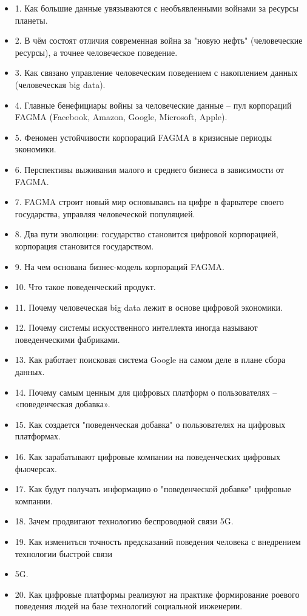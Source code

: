 \begin{itemize}
\item 1. Как большие данные увязываются с необъявленными войнами за ресурсы планеты.
\item 2. В чём состоят отличия современная война за "новую нефть" (человеческие ресурсы), а точнее человеческое поведение.
\item 3. Как связано управление человеческим поведением с накоплением данных (человеческая big data).
\item 4. Главные бенефициары войны за человеческие данные – пул корпораций FAGMA (Facebook, Amazon, Google, Microsoft, Apple).
\item 5. Феномен устойчивости корпораций FAGMA в кризисные периоды экономики.
\item 6. Перспективы выживания малого и среднего бизнеса в зависимости от FAGMA.
\item 7. FAGMA строит новый мир основываясь на цифре в фарватере своего государства, управляя человеческой популяцией.
\item 8. Два пути эволюции: государство становится цифровой корпорацией, корпорация становится государством.
\item 9. На чем основана бизнес-модель корпораций FAGMA.
\item 10. Что такое поведенческий продукт.
\item 11. Почему человеческая big data лежит в основе цифровой экономики.
\item 12. Почему системы искусственного интеллекта иногда называют поведенческими фабриками.
\item 13. Как работает поисковая система Google на самом деле в плане сбора данных.
\item 14. Почему самым ценным для цифровых платформ о пользователях – «поведенческая добавка».
\item 15. Как создается "поведенческая добавка" о пользователях на цифровых платформах.
\item 16. Как зарабатывают цифровые компании на поведенческих цифровых фьючерсах.
\item 17. Как будут получать информацию о "поведенческой добавке" цифровые компании.
\item 18. Зачем продвигают технологию беспроводной связи 5G.
\item 19. Как измениться точность предсказаний поведения человека с внедрением технологии быстрой связи \item 5G.
\item 20. Как цифровые платформы реализуют на практике формирование роевого поведения людей на базе технологий социальной инженерии.

\end{itemize}
